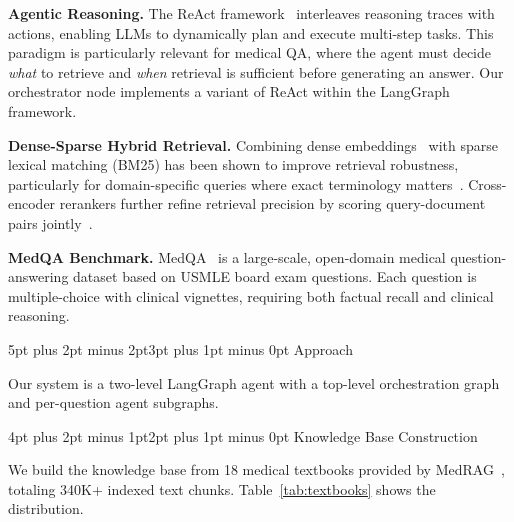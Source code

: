 \documentclass[10pt,twocolumn,letterpaper]{article}
\makeatletter
\renewcommand\section{\@startsection{section}{1}{\z@}%
  {5pt plus 2pt minus 2pt}{3pt plus 1pt minus 0pt}%
  {\large\bfseries}}
\renewcommand\subsection{\@startsection{subsection}{2}{\z@}%
  {4pt plus 2pt minus 1pt}{2pt plus 1pt minus 0pt}%
  {\normalsize\bfseries}}
\makeatother
\begin{document}
\textbf{Agentic Reasoning.} The ReAct framework~\cite{yao2023react} interleaves reasoning traces with actions, enabling LLMs to dynamically plan and execute multi-step tasks. This paradigm is particularly relevant for medical QA, where the agent must decide \emph{what} to retrieve and \emph{when} retrieval is sufficient before generating an answer. Our orchestrator node implements a variant of ReAct within the LangGraph framework.

\textbf{Dense-Sparse Hybrid Retrieval.} Combining dense embeddings~\cite{reimers2019sentence} with sparse lexical matching (BM25) has been shown to improve retrieval robustness, particularly for domain-specific queries where exact terminology matters~\cite{lin2021few}. Cross-encoder rerankers further refine retrieval precision by scoring query-document pairs jointly~\cite{nogueira2019passage}.

\textbf{MedQA Benchmark.} MedQA~\cite{jin2021disease} is a large-scale, open-domain medical question-answering dataset based on USMLE board exam questions. Each question is multiple-choice with clinical vignettes, requiring both factual recall and clinical reasoning.

\section{Approach}

Our system is a two-level LangGraph agent with a top-level orchestration graph and per-question agent subgraphs.

\subsection{Knowledge Base Construction}

We build the knowledge base from 18 medical textbooks provided by MedRAG~\cite{xiong2024benchmarking}, totaling 340K+ indexed text chunks. Table~\ref{tab:textbooks} shows the distribution.
\end{document}
